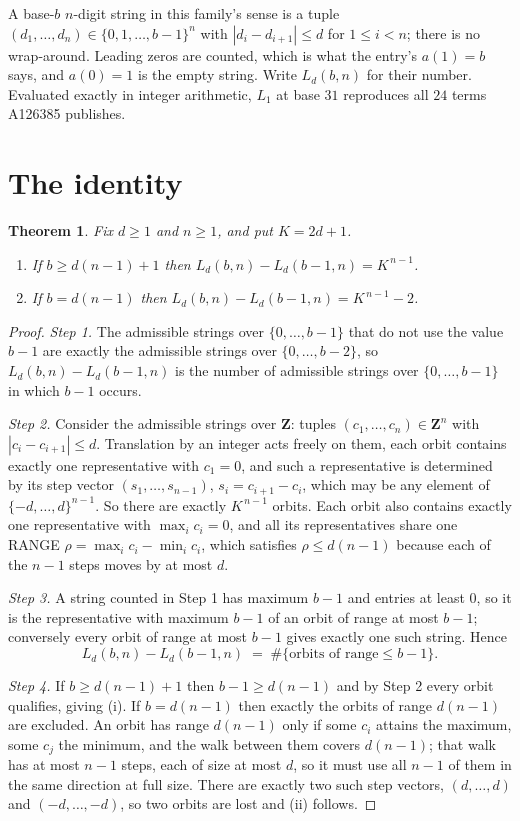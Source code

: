 \documentclass[11pt,a4paper]{article}
\theoremstyle{plain}
\newtheorem{theorem}{Theorem}
\theoremstyle{definition}
\begin{document}
A base-$b$ $n$-digit string in this family's sense is a tuple
$(d_1,\dots,d_n)\in\{0,1,\dots,b-1\}^{n}$ with $|d_i-d_{i+1}|\le d$ for $1\le i<n$; there
is no wrap-around. Leading zeros are counted, which is what the entry's $a(1)=b$ says, and
$a(0)=1$ is the empty string. Write $L_d(b,n)$ for their number. Evaluated exactly in integer
arithmetic, $L_{1}$ at base $31$ reproduces all $24$ terms A126385 publishes.

\section{The identity}

\begin{theorem}
Fix $d\ge1$ and $n\ge1$, and put $K=2d+1$.
\begin{enumerate}
\item[(i)] If $b\ge d(n-1)+1$ then $L_d(b,n)-L_d(b-1,n)=K^{\,n-1}$.
\item[(ii)] If $b=d(n-1)$ then $L_d(b,n)-L_d(b-1,n)=K^{\,n-1}-2$.
\end{enumerate}
\end{theorem}

\begin{proof}
\emph{Step 1.} The admissible strings over $\{0,\dots,b-1\}$ that do not use the value $b-1$
are exactly the admissible strings over $\{0,\dots,b-2\}$, so $L_d(b,n)-L_d(b-1,n)$ is the
number of admissible strings over $\{0,\dots,b-1\}$ in which $b-1$ occurs.

\emph{Step 2.} Consider the admissible strings over $\mathbf{Z}$: tuples
$(c_1,\dots,c_n)\in\mathbf{Z}^{n}$ with $|c_i-c_{i+1}|\le d$. Translation by an integer acts
freely on them, each orbit contains exactly one representative with $c_1=0$, and such a
representative is determined by its step vector $(s_1,\dots,s_{n-1})$, $s_i=c_{i+1}-c_i$,
which may be any element of $\{-d,\dots,d\}^{n-1}$. So there are exactly $K^{\,n-1}$ orbits.
Each orbit also contains exactly one representative with $\max_i c_i=0$, and all its
representatives share one RANGE $\rho=\max_ic_i-\min_ic_i$, which satisfies
$\rho\le d(n-1)$ because each of the $n-1$ steps moves by at most $d$.

\emph{Step 3.} A string counted in Step 1 has maximum $b-1$ and entries at least $0$, so it is
the representative with maximum $b-1$ of an orbit of range at most $b-1$; conversely every orbit
of range at most $b-1$ gives exactly one such string. Hence
\[
L_d(b,n)-L_d(b-1,n)\;=\;\#\{\text{orbits of range}\le b-1\} .
\]

\emph{Step 4.} If $b\ge d(n-1)+1$ then $b-1\ge d(n-1)$ and by Step 2 every orbit qualifies,
giving (i). If $b=d(n-1)$ then exactly the orbits of range $d(n-1)$ are excluded. An orbit has
range $d(n-1)$ only if some $c_i$ attains the maximum, some $c_j$ the minimum, and the walk
between them covers $d(n-1)$; that walk has at most $n-1$ steps, each of size at most $d$, so it
must use all $n-1$ of them in the same direction at full size. There are exactly two such step
vectors, $(d,\dots,d)$ and $(-d,\dots,-d)$, so two orbits are lost and (ii) follows.
\end{proof}
\end{document}
